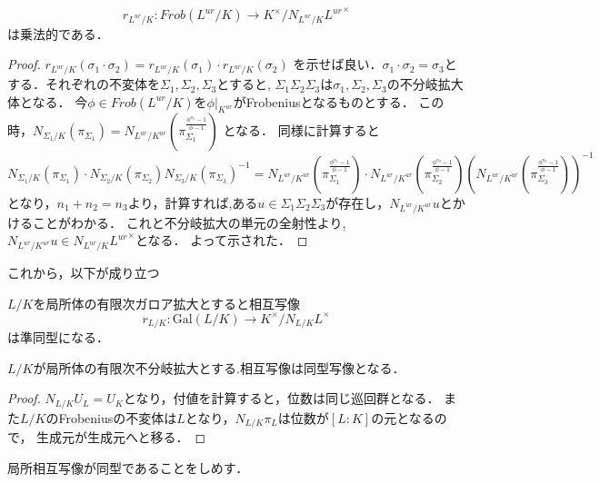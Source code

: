 \documentclass{ujarticle}
\begin{document}
\begin{prop}
 \begin{equation*}
  r_{L^{ur}/K}:Frob( L^{ur}/K ) \to K^{\times}/N_{L^{ur}/K}{L^{ur}}^{\times}
 \end{equation*}
 は乗法的である．
\end{prop}
\begin{proof}
$r_{L^{ur}/K} (\sigma_1 \cdot  \sigma_2) = r_{L^{ur}/K}(\sigma_1) \cdot r_{ L^{ur}/K}(\sigma_2)$
を示せば良い．$\sigma_1 \cdot \sigma_2 =\sigma_3$とする．それぞれの不変体を$\Sigma_1,\Sigma_2,\Sigma_3$とすると,
$\Sigma_1 \Sigma_2 \Sigma_3$は$\sigma_1,\Sigma_2,\Sigma_3$の不分岐拡大体となる．
今$\phi \in Frob(L^{ur}/K)$を$\phi|_{K^{ur}}$がFrobeniusとなるものとする．
この時，$N_{\Sigma_1/K}(\pi_{\Sigma_1}) = N_{L^{ur}/K^{ur}} (\pi_{\Sigma_1}^{\frac{\phi^{n_1}-1}{\phi -1}}) $
となる．
同様に計算すると
\begin{equation*}
  N_{\Sigma_1/K}(\pi_{\Sigma_1})  \cdot N_{\Sigma_2/K}(\pi_{\Sigma_2})  {N_{\Sigma_3/K}(\pi_{\Sigma_3})}^{-1} =
  N_{L^{ur}/K^{ur}} (\pi_{\Sigma_1}^{\frac{\phi^{n_1}-1}{\phi -1}})  \cdot N_{L^{ur}/K^{ur}} (\pi_{\Sigma_2}^{\frac{\phi^{n_2}-1}{\phi -1}})
  (N_{L^{ur}/K^{ur}} (\pi_{\Sigma_3}^{\frac{\phi^{n_3}-1}{\phi -1}}))^{-1}
\end{equation*}
となり，$n_1 + n_2 = n_3$より，計算すれば,ある$u \in \Sigma_1 \Sigma_2 \Sigma_3$が存在し，$N_{L^{ur}/K^{ur}}u$とかけることがわかる．
これと不分岐拡大の単元の全射性より,$N_{L^{ur}/K^{ur}}u \in N_{L^{ur}/K} {L^{ur}}^{\times}$となる．
よって示された．
\end{proof}

これから，以下が成り立つ
\begin{cor}
 $L/K$を局所体の有限次ガロア拡大とすると相互写像
 \begin{equation*}
  r_{L/K}: \mathrm{Gal}(L/K) \to K^{\times}/N_{L/K}L^{\times}
 \end{equation*}
 は準同型になる．
\end{cor}

\begin{cor}
 $L/K$が局所体の有限次不分岐拡大とする.相互写像は同型写像となる．
\end{cor}
\begin{proof}
 $N_{L/K}U_L=U_K$となり，付値を計算すると，位数は同じ巡回群となる．
 また$L/K$のFrobeniusの不変体は$L$となり，$N_{L/K}\pi_L$は位数が$[L:K]$の元となるので，
 生成元が生成元へと移る．
\end{proof}


局所相互写像が同型であることをしめす．
\end{document}
